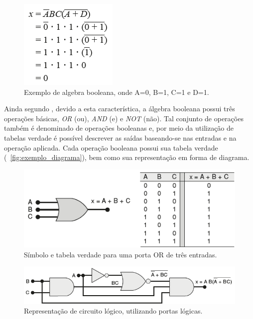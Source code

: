 \begin{figure}[H]
	\begin{center}
    \caption{\label{fig:algebra_booleana}Exemplo de algebra booleana, onde A=0, B=1, C=1 e D=1.}
	\includegraphics[scale=0.70]{Figuras/algebra_booleana.png}
	\end{center}
\end{figure}

\par
Ainda segundo , devido a esta característica, a álgebra booleana possui três operações básicas, \textit{OR} (ou), \textit{AND} (e) e \textit{NOT} (não). Tal conjunto de operações também é denominado de operações booleanas e, por meio da utilização de tabelas verdade é possível descrever as saídas baseando-se nas entradas e na operação aplicada. Cada operação booleana possui sua tabela verdade (~\autoref{fig:exemplo_diagrama}), bem como sua representação em forma de diagrama.

\begin{figure}[H]
	\begin{center}
    \caption{\label{fig:exemplo_diagrama}Símbolo e tabela verdade para uma porta OR de três entradas.}
	\includegraphics[scale=0.60]{Figuras/exemplo_diagrama.png}
	\end{center}
\end{figure}

\begin{figure}[H]
	\begin{center}
    \caption{\label{fig:exemplo_circuito} Representação de circuito lógico, utilizando portas lógicas.}
	\includegraphics[scale=0.60]{Figuras/exemplo_circuito.png}
	\end{center}
\end{figure}

